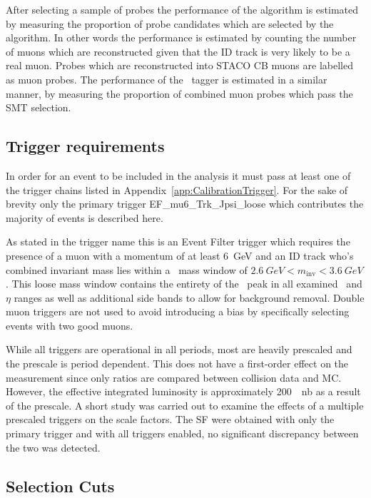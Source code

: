 After selecting a sample of probes the performance of the algorithm is estimated by measuring the proportion of probe candidates which are selected by the algorithm. In other words the performance is estimated by counting the number of muons which are reconstructed given that the ID track is very likely to be a real muon. Probes which are reconstructed into STACO CB muons are labelled as muon probes. The performance of the \xsm\ tagger is estimated in a similar manner, by measuring the proportion of combined muon probes which pass the SMT selection.

\subsection{Trigger requirements} \label{sec:CalibrationTriggerRequirement}

In order for an event to be included in the analysis it must pass at least one of the trigger chains listed in Appendix~\ref{app:CalibrationTrigger}. For the sake of brevity only the primary trigger EF\_mu6\_Trk\_Jpsi\_loose which contributes the majority of events is described here.

As stated in the trigger name this is an Event Filter trigger which requires the presence of a muon with a momentum of at least \SI{6}{GeV} and an ID track who's combined invariant mass lies within a \jpsi\ mass window of $\SI{2.6}{GeV}<m_{\textrm{inv}}<\SI{3.6}{GeV}$. This loose mass window contains the entirety of the \jpsi\ peak in all examined \pt\ and $\eta$ ranges as well as additional side bands to allow for background removal. Double muon triggers are not used to avoid introducing a bias by specifically selecting events with two good muons. 

While all triggers are operational in all periods, most are heavily prescaled and the prescale is period dependent. This does not have a first-order effect on the measurement since only ratios are compared between collision data and MC. However, the effective integrated luminosity is approximately \SI{200}{\per\nano\barn} as a result of the prescale. A short study was carried out to examine the effects of a multiple prescaled triggers on the scale factors. The SF were obtained with only the primary trigger and with all triggers enabled, no significant discrepancy between the two was detected.

\subsection{Selection Cuts} \label{sec:CalibrationSelectionCuts}

